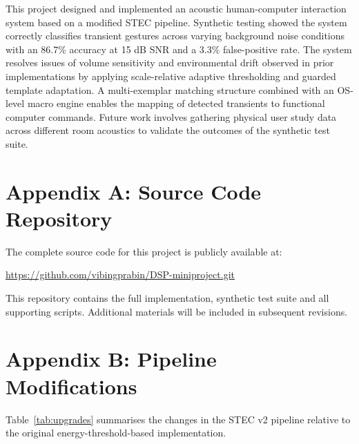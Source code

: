 \documentclass[12pt,a4paper]{article}
\begin{document}
This project designed and implemented an acoustic human-computer interaction system based on a modified STEC pipeline. Synthetic testing showed the system correctly classifies transient gestures across varying background noise conditions with an 86.7\% accuracy at 15 dB SNR and a 3.3\% false-positive rate. The system resolves issues of volume sensitivity and environmental drift observed in prior implementations by applying scale-relative adaptive thresholding and guarded template adaptation. A multi-exemplar matching structure combined with an OS-level macro engine enables the mapping of detected transients to functional computer commands. Future work involves gathering physical user study data across different room acoustics to validate the outcomes of the synthetic test suite.

\clearpage

\section*{Appendix A: Source Code Repository}

The complete source code for this project is publicly available at:
\begin{center}
\url{https://github.com/vibingprabin/DSP-miniproject.git}
\end{center}
This repository contains the full implementation, synthetic test suite and all supporting scripts. Additional materials will be included in subsequent revisions.

\vspace{1cm}

\section*{Appendix B: Pipeline Modifications}

Table~\ref{tab:upgrades} summarises the changes in the STEC v2 pipeline relative to the original energy-threshold-based implementation.
\end{document}
